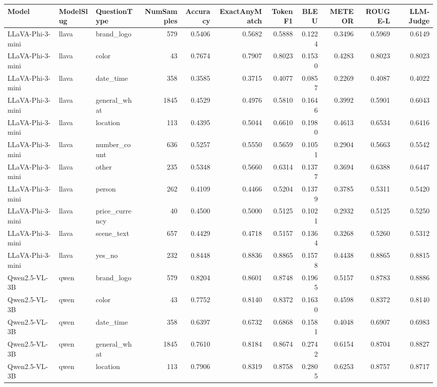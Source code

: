 \begin{tabular}{lllrrrrrrrr}
\toprule
Model & ModelSlug & QuestionType & NumSamples & Accuracy & ExactAnyMatch & TokenF1 & BLEU & METEOR & ROUGE-L & LLM-Judge \\
\midrule
LLaVA-Phi-3-mini & llava & brand_logo & 579 & 0.5406 & 0.5682 & 0.5888 & 0.1224 & 0.3496 & 0.5969 & 0.6149 \\
LLaVA-Phi-3-mini & llava & color & 43 & 0.7674 & 0.7907 & 0.8023 & 0.1530 & 0.4283 & 0.8023 & 0.8023 \\
LLaVA-Phi-3-mini & llava & date_time & 358 & 0.3585 & 0.3715 & 0.4077 & 0.0857 & 0.2269 & 0.4087 & 0.4022 \\
LLaVA-Phi-3-mini & llava & general_what & 1845 & 0.4529 & 0.4976 & 0.5810 & 0.1646 & 0.3992 & 0.5901 & 0.6043 \\
LLaVA-Phi-3-mini & llava & location & 113 & 0.4395 & 0.5044 & 0.6610 & 0.1980 & 0.4613 & 0.6534 & 0.6416 \\
LLaVA-Phi-3-mini & llava & number_count & 636 & 0.5257 & 0.5550 & 0.5659 & 0.1051 & 0.2904 & 0.5663 & 0.5542 \\
LLaVA-Phi-3-mini & llava & other & 235 & 0.5348 & 0.5660 & 0.6314 & 0.1377 & 0.3694 & 0.6388 & 0.6447 \\
LLaVA-Phi-3-mini & llava & person & 262 & 0.4109 & 0.4466 & 0.5204 & 0.1379 & 0.3785 & 0.5311 & 0.5420 \\
LLaVA-Phi-3-mini & llava & price_currency & 40 & 0.4500 & 0.5000 & 0.5125 & 0.1021 & 0.2932 & 0.5125 & 0.5250 \\
LLaVA-Phi-3-mini & llava & scene_text & 657 & 0.4429 & 0.4718 & 0.5157 & 0.1364 & 0.3268 & 0.5260 & 0.5312 \\
LLaVA-Phi-3-mini & llava & yes_no & 232 & 0.8448 & 0.8836 & 0.8865 & 0.1578 & 0.4438 & 0.8865 & 0.8815 \\
Qwen2.5-VL-3B & qwen & brand_logo & 579 & 0.8204 & 0.8601 & 0.8748 & 0.1965 & 0.5157 & 0.8783 & 0.8886 \\
Qwen2.5-VL-3B & qwen & color & 43 & 0.7752 & 0.8140 & 0.8372 & 0.1630 & 0.4598 & 0.8372 & 0.8140 \\
Qwen2.5-VL-3B & qwen & date_time & 358 & 0.6397 & 0.6732 & 0.6868 & 0.1581 & 0.4048 & 0.6907 & 0.6983 \\
Qwen2.5-VL-3B & qwen & general_what & 1845 & 0.7610 & 0.8184 & 0.8674 & 0.2742 & 0.6154 & 0.8704 & 0.8827 \\
Qwen2.5-VL-3B & qwen & location & 113 & 0.7906 & 0.8319 & 0.8758 & 0.2805 & 0.6253 & 0.8757 & 0.8717 \\

\end{tabular}
